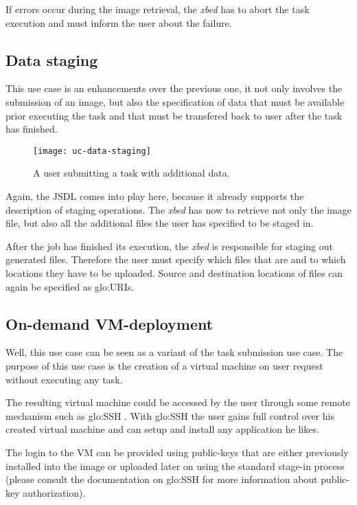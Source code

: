 If errors occur  during the image retrieval, the  \emph{xbed} has to abort
the task execution and must inform the user about the failure.

\subsection{Data staging}
\label{sec:uc-data-staging}

This  use case  is an  enhancements  over the  previous one,  it not  only
involves the  submission of an image,  but also the  specification of data
that  must  be  available  prior  executing  the task  and  that  must  be
transfered back to user after the task has finished.

\begin{figure}[htbp]
  \centering
  \texttt{[image: uc-data-staging]}
  \caption[UC  Data  Staging]{A user  submitting  a  task with  additional
    data.}
  \label{fig:uc-data-staging}
\end{figure}

Again,  the JSDL comes  into play  here, because  it already  supports the
description of staging operations. The \emph{xbed} has now to retrieve not
only  the image  file, but  also  all the  additional files  the user  has
specified to be staged in.

After the job  has finished its execution, the  \emph{xbed} is responsible
for staging  out generated  files. Therefore the  user must  specify which
files that are and to which locations they have to be uploaded. Source and
destination locations of files can again be specified as \gls{glo:URI}s.

\subsection{On-demand VM-deployment}
\label{sec:uc-on-demand-vm-deployment}

Well, this use  case can be seen  as a variant of the  task submission use
case. The purpose of this use case is the creation of a virtual machine on
user request without executing any task.

The resulting virtual  machine could be accessed by  the user through some
remote mechanism such as \gls{glo:SSH} \cite{openssh}.  With \gls{glo:SSH}
the user gains full control over his created virtual machine and can setup
and install any application he likes.

The login  to the  VM can  be provided using  public-keys that  are either
previously  installed  into the  image  or  uploaded  later on  using  the
standard   stage-in   process  (please   consult   the  documentation   on
\gls{glo:SSH} for more information about public-key authorization).


